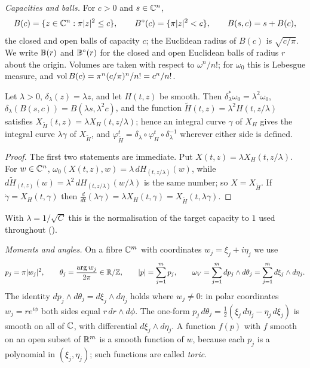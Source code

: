 \emph{Capacities and balls.} For $c>0$ and $s\in\mathbb{C}^n$,
\[
 B(c)=\{z\in\mathbb{C}^n:\pi|z|^2\le c\},\qquad B^{\circ}(c)=\{\pi|z|^2<c\},\qquad B(s,c)=s+B(c),
\]
the closed and open balls of capacity $c$; the Euclidean radius of $B(c)$ is $\sqrt{c/\pi}$. We write
$\mathbb{B}(r)$ and $\mathbb{B}^\circ(r)$ for the closed and open Euclidean balls of radius $r$ about the origin.
Volumes are taken with respect to $\omega^n/n!$; for $\omega_0$ this is Lebesgue measure, and
$\operatorname{vol} B(c)=\pi^n(c/\pi)^n/n!=c^n/n!$.

\begin{lemma}[Dilations]\label{lem:pre-dilation}
Let $\lambda>0$, $\delta_\lambda(z)=\lambda z$, and let $H(t,z)$ be smooth. Then
$\delta_\lambda^*\omega_0=\lambda^2\omega_0$, $\delta_\lambda(B(s,c))=B(\lambda s,\lambda^2c)$, and the function
$\tilde H(t,z)=\lambda^2H(t,z/\lambda)$ satisfies $X_{\tilde H}(t,z)=\lambda X_H(t,z/\lambda)$; hence an integral curve
$\gamma$ of $X_H$ gives the integral curve $\lambda\gamma$ of $X_{\tilde H}$, and
$\varphi^t_{\tilde H}=\delta_\lambda\circ\varphi^t_H\circ\delta_\lambda^{-1}$ wherever either side is defined.
\end{lemma}

\begin{proof}
The first two statements are immediate. Put $X(t,z)=\lambda X_H(t,z/\lambda)$. For $w\in\mathbb{C}^n$,
$\omega_0(X(t,z),w)=\lambda\,dH_{(t,z/\lambda)}(w)$, while $d\tilde H_{(t,z)}(w)=\lambda^2\,dH_{(t,z/\lambda)}(w/\lambda)$ is the same
number; so $X=X_{\tilde H}$. If $\dot\gamma=X_H(t,\gamma)$ then
$\frac d{dt}(\lambda\gamma)=\lambda X_H(t,\gamma)=X_{\tilde H}(t,\lambda\gamma)$.
\end{proof}

With $\lambda=1/\sqrt C$ this is the normalisation of the target capacity to $1$ used throughout
().

\emph{Moments and angles.} On a fibre $\mathbb{C}^m$ with coordinates $w_j=\xi_j+i\eta_j$ we use
\[
 p_j=\pi|w_j|^2,\qquad \theta_j=\frac{\arg w_j}{2\pi}\in\mathbb{R}/\mathbb{Z},\qquad |p|=\sum_{j=1}^mp_j,\qquad
 \omega_V=\sum_{j=1}^mdp_j\wedge d\theta_j=\sum_{j=1}^md\xi_j\wedge d\eta_j .
\]
The identity $dp_j\wedge d\theta_j=d\xi_j\wedge d\eta_j$ holds where $w_j\ne0$: in polar coordinates
$w_j=re^{i\phi}$ both sides equal $r\,dr\wedge d\phi$. The one-form $p_j\,d\theta_j=\frac12(\xi_j\,d\eta_j-\eta_j\,d\xi_j)$
is smooth on all of $\mathbb{C}$, with differential $d\xi_j\wedge d\eta_j$. A function $f(p)$ with $f$ smooth on an
open subset of $\mathbb{R}^m$ is a smooth function of $w$, because each $p_j$ is a polynomial in $(\xi_j,\eta_j)$;
such functions are called \emph{toric}.

